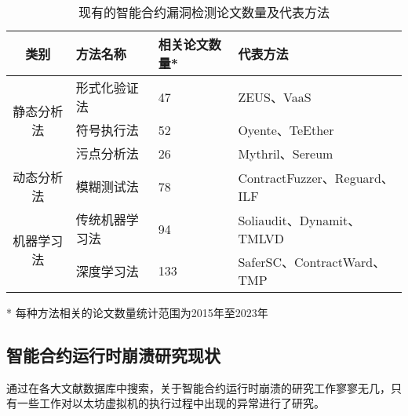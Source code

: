 \begin{table}[htbp]
    \caption{\label{tab:defect_detection_methods}现有的智能合约漏洞检测论文数量及代表方法}
    \small
    \begin{threeparttable}
        {
            \renewcommand{\arraystretch}{1.5}
        \begin{tabularx}{\linewidth}{cp{3cm}<{\centering}p{3cm}<{\centering}X<{\centering}}
            \toprule
            类别                     & 方法名称   & 相关论文数量* & 代表方法 \\ \midrule
            \multirow{3}{*}{静态分析法} & 形式化验证法 & 47    & ZEUS\cite{kalra2018zeus}、VaaS\cite{garfatta2021survey}  \\
                                   & 符号执行法  & 52    & Oyente\cite{luu2016making}、TeEther\cite{krupp2018teether}  \\
                                   & 污点分析法  & 26    & Mythril\cite{mythril}、Sereum\cite{rodler2018sereum}  \\ \midrule
            动态分析法                  & 模糊测试法  & 78    & ContractFuzzer\cite{jiang2018contractfuzzer}、Reguard\cite{liu2018reguard}、ILF\cite{he2019learning}  \\ \midrule
            \multirow{2}{*}{机器学习法} & 传统机器学习法  & 94    & Soliaudit\cite{liao2019soliaudit}、Dynamit\cite{Dynamit}、TMLVD\cite{TMLVD}  \\
                                   & 深度学习法  & 133    & SaferSC\cite{tann2018towards}、ContractWard\cite{wang2020contractward}、TMP\cite{zhuang2021smart}  \\ \bottomrule
        \end{tabularx}
        }
        \begin{tablenotes}
            \footnotesize
            \item[*] 每种方法相关的论文数量统计范围为2015年至2023年
        \end{tablenotes}
    \end{threeparttable}
\end{table}

\subsection{智能合约运行时崩溃研究现状}
\label{sec:智能合约运行时崩溃研究现状}
通过在各大文献数据库中搜索，关于智能合约运行时崩溃的研究工作寥寥无几，只有一些工作对以太坊虚拟机的执行过程中出现的异常进行了研究。


